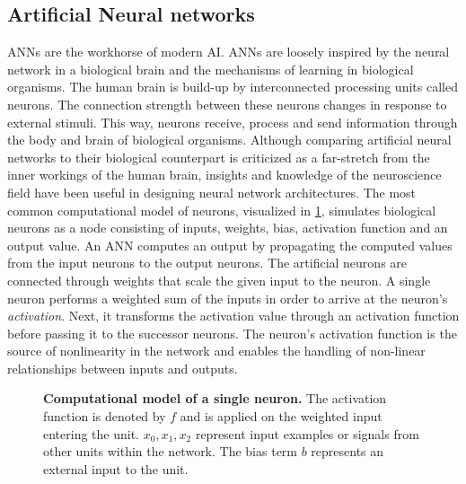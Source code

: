\documentclass[\home/main.tex]{subfiles}
\begin{document}
\subsection{Artificial Neural networks} \label{subsec:lit_dnn}

\Glspl{ANN} are the workhorse of modern \gls{AI}. \Glspl{ANN} are loosely inspired by the neural network in a biological brain and the mechanisms of learning in biological organisms. The human brain is build-up by interconnected processing units called neurons. The connection strength between these neurons changes in response to external stimuli. This way, neurons receive, process and send information through the body and brain of biological organisms. Although comparing artificial neural networks to their biological counterpart is criticized as a far-stretch from the inner workings of the human brain, insights and knowledge of the neuroscience field have been useful in designing neural network architectures. The most common computational model of neurons, visualized in \cref{fig:neuron}, simulates biological neurons as a node consisting of inputs, weights, bias, activation function and an output value. An \gls{ANN} computes an output by propagating the computed values from the input neurons to the output neurons. The artificial neurons are connected through weights that scale the given input to the neuron. A single neuron performs a weighted sum of the inputs in order to arrive at the neuron's \textit{activation}. Next, it transforms the activation value through an activation function before passing it to the successor neurons. The neuron's activation function is the source of nonlinearity in the network and enables the handling of non-linear relationships between inputs and outputs.

\begin{figure}[htbp]
	\centering
	
	\caption[Computational model of a single neuron.]{\textbf{ Computational model of a single neuron.} The activation function is denoted by $f$ and is applied on the weighted input entering the unit. $x_0, x_1, x_2$ represent input examples or signals from other units within the network. The bias term $b$ represents an external input to the unit.}
	\label{fig:neuron}
\end{figure}
\end{document}
